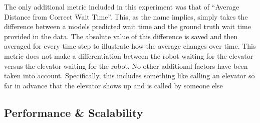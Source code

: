 The only additional metric included in this experiment was that of ``Average
Distance from Correct Wait Time''. This, as the name implies, simply takes the
difference between a models predicted wait time and the ground truth wait time
provided in the data. The absolute value of this difference is saved and then
averaged for every time step to illustrate how the average changes over time. This
metric does not make a differentiation between the robot waiting for the
elevator versus the elevator waiting for the robot. No other additional
factors have been taken into account. Specifically, this includes something like calling an
elevator so far in advance that the elevator shows up and is called by someone
else

\subsection{ Performance \& Scalability }

\begin{table}[h!]
  \centering
  \caption{Elevator Wait Time Overview}
  \label{table:Elevator_Wait_Time_Overview}
\end{table}


\begin{table}[h!]
  \centering
  \caption{High Resolution Elevator Wait Time Overview}
  \label{table:High_Resolution_Elevator_Wait_Time_Overview}
\end{table}

